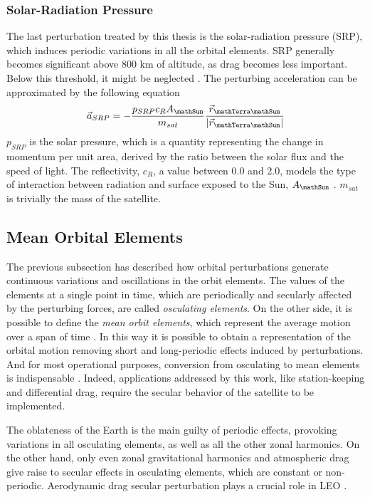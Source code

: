 \subsubsection{Solar-Radiation Pressure}
The last perturbation treated by this thesis is the solar-radiation pressure (SRP), which induces periodic variations in all the orbital elements.
SRP generally becomes significant above 800 km of altitude, as drag becomes less important. Below this threshold, it might be neglected \cite{wertz2009orbit}.
The perturbing acceleration can be approximated by the following equation \cite{vallado2013fundamentals}
\begin{equation} \label{eq:srp_acc}
    \vec{a}_{SRP} = - \frac{p_{SRP} c_{R} A_{\mathSun}}{m_{sat}} \frac{\vec{r}_{\mathTerra \mathSun}}{|\vec{r}_{\mathTerra \mathSun}|}
\end{equation}
$p_{SRP}$ is the solar pressure, which is a quantity representing the change in momentum per unit area, derived by the ratio between the solar flux and the speed of light.
The reflectivity, $c_R$, a value between 0.0 and 2.0, models the type of interaction between radiation and surface exposed to the Sun, $A_{\mathSun}$ \cite{vallado2013fundamentals}.
$m_{sat}$ is trivially the mass of the satellite.

\subsection{Mean Orbital Elements}
The previous subsection has described how orbital perturbations generate continuous variations and oscillations in the orbit elements.
The values of the elements at a single point in time, which are periodically and secularly affected by the perturbing forces, are called \textit{osculating elements}.
On the other side, it is possible to define the \textit{mean orbit elements}, which represent the average motion over a span of time \cite{wertz2009orbit}.
In this way it is possible to obtain a representation of the orbital motion removing short and long-periodic effects induced by perturbations.
And for most operational purposes, conversion from osculating to mean elements is indispensable \cite{walter1967conversion}.
Indeed, applications addressed by this work, like station-keeping and differential drag, require the secular behavior of the satellite to be implemented.

The oblateness of the Earth is the main guilty of periodic effects, provoking variations in all osculating elements, as well as all the other zonal harmonics.
On the other hand, only even zonal gravitational harmonics and atmospheric drag give raise to secular effects in osculating elements, which are constant or non-periodic.
Aerodynamic drag secular perturbation plays a crucial role in LEO \cite{der1996conversion}.

